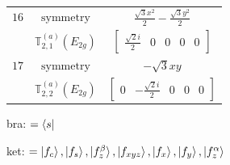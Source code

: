 \documentclass[fleqn,8pt,landscape]{jsarticle}
\begin{document}
\begin{longtable}{ccc}
$ 16 $ & $ \text{symmetry} $ & $ \frac{\sqrt{3} x^{2}}{2} - \frac{\sqrt{3} y^{2}}{2} $ \\
$  $ & $ \mathbb{T}_{2,1}^{(a)}(E_{2g}) $ & $ \begin{bmatrix} \frac{\sqrt{2} i}{2} & 0 & 0 & 0 & 0 \end{bmatrix} $ \\ \hline
$ 17 $ & $ \text{symmetry} $ & $ - \sqrt{3} x y $ \\
$  $ & $ \mathbb{T}_{2,2}^{(a)}(E_{2g}) $ & $ \begin{bmatrix} 0 & - \frac{\sqrt{2} i}{2} & 0 & 0 & 0 \end{bmatrix} $ \\ \hline
\end{longtable}
bra: $=\bra{s}$

\noindent
ket: $=\ket{f_{c}}, \ket{f_{s}}, \ket{f_{z}^{\beta}}, \ket{f_{xyz}}, \ket{f_{x}}, \ket{f_{y}}, \ket{f_{z}^{\alpha}}$
\renewcommand{\arraystretch}{1.6}
\end{document}
